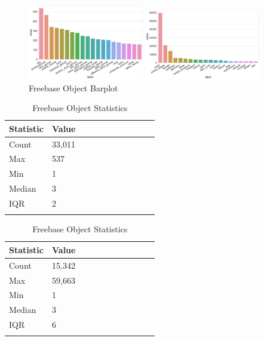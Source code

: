 
\begin{figure}[H]
	\parbox{.5\linewidth}{
   		\centering
    		\includegraphics[width=0.45\textwidth, height=0.2\textheight]{Wordnet_Object_Counts}
		\caption{Wordnet Object Barplot}
		}
	\hfill
	\parbox{.5\linewidth}{
   		\centering
		\includegraphics[width=0.45\textwidth, height=0.2\textheight]{Freebase_Object_Counts}
		\caption{Freebase Object Barplot}
		}
\end{figure}


\begin{table}[H]
	\parbox{.5\linewidth}{
		\centering
		\begin{tabular}{lllllllllll}
  			\textbf{Statistic} & \textbf{Value}  \\
  			\hline
			Count & 33,011 \\
			Max & 537 \\
			Min & 1 \\
  			Median & 3 \\
  			IQR & 2 \\
				&
		\end{tabular}
		\caption{Wordnet Object Statistics}
		}
	\hfill
	\parbox{.5\linewidth}{
		\centering
		\begin{tabular}{lllllllllll}
  			\textbf{Statistic} & \textbf{Value}  \\
  			\hline
			Count & 15,342 \\
			Max & 59,663 \\
			Min & 1 \\
  			Median & 3 \\
  			IQR & 6 \\
				&
		\end{tabular}
		\caption{Freebase Object Statistics}
		}
\end{table}

